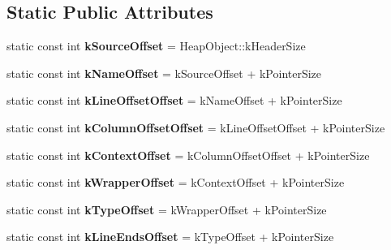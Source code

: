 \subsection*{Static Public Attributes}
\begin{DoxyCompactItemize}
\item 
\hypertarget{classv8_1_1internal_1_1_script_a225adb25596f83c8821fe3eabd39c511}{}static const int {\bfseries k\+Source\+Offset} = Heap\+Object\+::k\+Header\+Size\label{classv8_1_1internal_1_1_script_a225adb25596f83c8821fe3eabd39c511}

\item 
\hypertarget{classv8_1_1internal_1_1_script_a40ff6e23759cd2b3a04ecf027325ce78}{}static const int {\bfseries k\+Name\+Offset} = k\+Source\+Offset + k\+Pointer\+Size\label{classv8_1_1internal_1_1_script_a40ff6e23759cd2b3a04ecf027325ce78}

\item 
\hypertarget{classv8_1_1internal_1_1_script_a956dac18eae162c1b27233b8dde59f24}{}static const int {\bfseries k\+Line\+Offset\+Offset} = k\+Name\+Offset + k\+Pointer\+Size\label{classv8_1_1internal_1_1_script_a956dac18eae162c1b27233b8dde59f24}

\item 
\hypertarget{classv8_1_1internal_1_1_script_a07bdb4450a61351c14c57340cb433def}{}static const int {\bfseries k\+Column\+Offset\+Offset} = k\+Line\+Offset\+Offset + k\+Pointer\+Size\label{classv8_1_1internal_1_1_script_a07bdb4450a61351c14c57340cb433def}

\item 
\hypertarget{classv8_1_1internal_1_1_script_aa5f92f3d5a8070ff039dd47e866d942e}{}static const int {\bfseries k\+Context\+Offset} = k\+Column\+Offset\+Offset + k\+Pointer\+Size\label{classv8_1_1internal_1_1_script_aa5f92f3d5a8070ff039dd47e866d942e}

\item 
\hypertarget{classv8_1_1internal_1_1_script_a1a469ce1fd98e3243c5c93e23d8af841}{}static const int {\bfseries k\+Wrapper\+Offset} = k\+Context\+Offset + k\+Pointer\+Size\label{classv8_1_1internal_1_1_script_a1a469ce1fd98e3243c5c93e23d8af841}

\item 
\hypertarget{classv8_1_1internal_1_1_script_a209c86d068d81195af0c6382f771f5ae}{}static const int {\bfseries k\+Type\+Offset} = k\+Wrapper\+Offset + k\+Pointer\+Size\label{classv8_1_1internal_1_1_script_a209c86d068d81195af0c6382f771f5ae}

\item 
\hypertarget{classv8_1_1internal_1_1_script_a4ad5125df9cf76582ea2a70b11c70bba}{}static const int {\bfseries k\+Line\+Ends\+Offset} = k\+Type\+Offset + k\+Pointer\+Size\label{classv8_1_1internal_1_1_script_a4ad5125df9cf76582ea2a70b11c70bba}


\end{DoxyCompactItemize}
